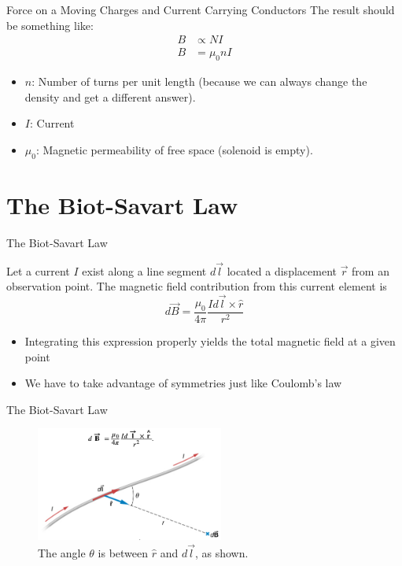 \documentclass{beamer}
\begin{document}
\begin{frame}{Force on a Moving Charges and Current Carrying Conductors}
The result should be something like:
\begin{align}
B &\propto N I \\
B &= \mu_0 n I
\end{align}
\begin{itemize}
\item $n$: Number of turns per unit length (because we can always change the density and get a different answer).
\item $I$: Current
\item $\mu_0$: Magnetic permeability of free space (solenoid is empty).
\end{itemize}
\end{frame}

\section{The Biot-Savart Law}

\begin{frame}{The Biot-Savart Law}
\begin{tcolorbox}[colback=white,colframe=black!40!black,title=The Biot-Savart Law]
\alert{Let a current $I$ exist along a line segment $d\vec{l}$ located a displacement $\vec{r}$ from an observation point.  The magnetic field contribution from this current element is
\begin{equation}
d\vec{B} = \frac{\mu_0}{4\pi} \frac{Id\vec{l} \times \hat{r}}{r^2}
\label{eq:biot}
\end{equation}}
\end{tcolorbox}
\begin{itemize}
\item Integrating this expression properly yields the total magnetic field at a given point
\item We have to take advantage of symmetries just like Coulomb's law
\end{itemize}
\end{frame}

\begin{frame}{The Biot-Savart Law}
\begin{figure}
\centering
\includegraphics[width=0.55\textwidth]{figures/biot1.png}
\caption{\label{fig:biot1} The angle $\theta$ is between $\hat{r}$ and $d\vec{l}$, as shown.}
\end{figure}
\end{frame}
\end{document}
